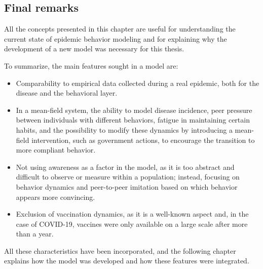 \subsection{Final remarks}
All the concepts presented in this chapter are useful for understanding the current state of epidemic behavior modeling and for explaining why the development of a new model was necessary for this thesis.

To summarize, the main features sought in a model are:

\begin{itemize} 
	\item Comparability to empirical data collected during a real epidemic, both for the disease and the behavioral layer. 
	\item In a mean-field system, the ability to model disease incidence, peer pressure between individuals with different behaviors, fatigue in maintaining certain habits, and the possibility to modify these dynamics by introducing a mean-field intervention, such as government actions, to encourage the transition to more compliant behavior. 
	\item Not using awareness as a factor in the model, as it is too abstract and difficult to observe or measure within a population; instead, focusing on behavior dynamics and peer-to-peer imitation based on which behavior appears more convincing. 
	\item Exclusion of vaccination dynamics, as it is a well-known aspect and, in the case of COVID-19, vaccines were only available on a large scale after more than a year. 
\end{itemize}

All these characteristics have been incorporated, and the following chapter explains how the model was developed and how these features were integrated.
